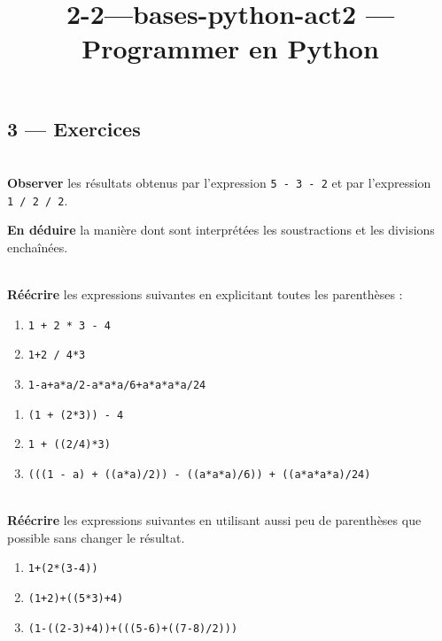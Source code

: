 \documentclass[a4paper,17pt]{extarticle}
\title{2-2---bases-python-act}
\newenvironment{eleve}%
{\begin{activite}\color{noiramu}\\[-0.5cm]}
{\end{activite}}
\providecommand{\tightlist}{%
      \setlength{\itemsep}{0pt}\setlength{\parskip}{0pt}}
\begin{document}
    
    \title{2 --- Programmer en Python}

    
    

    
    \hypertarget{exercices}{%
\subsection{3 --- Exercices}\label{exercices}}
\begin{eleve}
    \textbf{Observer} les résultats obtenus par l'expression
\texttt{5\ -\ 3\ -\ 2} et par l'expression \texttt{1\ /\ 2\ /\ 2}.

\textbf{En déduire} la manière dont sont interprétées les soustractions
et les divisions enchaînées.
        
        \end{eleve}\begin{eleve}
    \textbf{Réécrire} les expressions suivantes en explicitant toutes les
parenthèses :

\begin{enumerate}
\def\labelenumi{\arabic{enumi}.}
\tightlist
\item
  \texttt{1\ +\ 2\ *\ 3\ -\ 4}
\item
  \texttt{1+2\ /\ 4*3}
\item
  \texttt{1-a+a*a/2-a*a*a/6+a*a*a*a/24}
\end{enumerate}
        
        \end{eleve}\begin{reponse}
    \begin{enumerate}
\def\labelenumi{\arabic{enumi}.}
\tightlist
\item
  \texttt{(1\ +\ (2*3))\ -\ 4}
\item
  \texttt{1\ +\ ((2/4)*3)}
\item
  \texttt{(((1\ -\ a)\ +\ ((a*a)/2))\ -\ ((a*a*a)/6))\ +\ ((a*a*a*a)/24)}
\end{enumerate}

        \end{reponse}\begin{eleve}
    \textbf{Réécrire} les expressions suivantes en utilisant aussi peu de
parenthèses que possible sans changer le résultat.

\begin{enumerate}
\def\labelenumi{\arabic{enumi}.}
\tightlist
\item
  \texttt{1+(2*(3-4))}
\item
  \texttt{(1+2)+((5*3)+4)}
\item
  \texttt{(1-((2-3)+4))+(((5-6)+((7-8)/2)))}
\end{enumerate}
        

\end{eleve}
\end{document}
